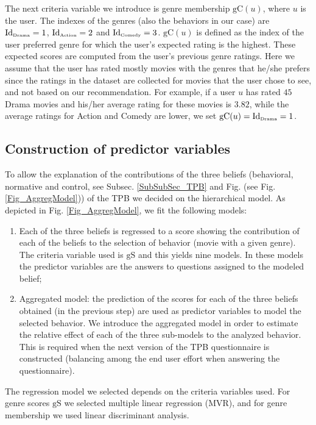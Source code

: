 \documentclass{llncs}
\def\gS{{\mbox{gS}}}
\def\gC{{\mbox{gC}}}
\def\Id{{\mbox{Id}}}
\begin{document}
The next criteria variable we introduce is genre membership $\gC(u)$, where $u$ is the user. The indexes of the genres (also the behaviors in our case) are $\Id_{\mbox{\tiny Drama}}=1$, $\Id_{\mbox{\tiny Action}}=2$ and $\Id_{\mbox{\tiny Comedy}}=3$. $\gC(u)$ is defined as the index of the user preferred genre for which the user's expected rating is the highest. These expected scores are computed from the user's previous genre ratings. Here we assume that the user has rated mostly movies with the genres that he/she prefers since the ratings in the dataset are collected for movies that the user chose to see, and not based on our recommendation.  For example, if a user $u$ has rated $45$ Drama movies and his/her average rating for these movies is $3.82$, while the average ratings for Action and Comedy are lower, we set $\gC(u)=\Id_{\mbox{\tiny Drama}}=1$.
 
\subsection{Construction of predictor variables}\label{SubSec_PredVarConstr} 

To allow the explanation of the contributions of the three beliefs (behavioral, normative and control, see Subsec.  \ref{SubSubSec_TPB} and Fig. (see Fig. \ref{Fig_AggregModel})) of the TPB we decided on the hierarchical model. As depicted in Fig. \ref{Fig_AggregModel}, we fit the following models:  
\begin{enumerate}
 \item Each of the three beliefs is regressed to a score showing the contribution of each of the beliefs to the selection of behavior (movie with a given genre). The criteria variable used is $\gS$ and this yields nine models. In these models the predictor variables are the answers to questions assigned to the modeled belief; 
 \item Aggregated model: the prediction of the scores for each of the three beliefs obtained (in the previous step) are used as predictor variables to model the selected behavior. We introduce the aggregated model in order to estimate the relative effect of each of the three sub-models to the analyzed behavior. This is required when the next version of the TPB questionnaire is constructed (balancing among the end user effort when answering the questionnaire).
\end{enumerate}
The regression model we selected depends on the criteria variables used. For genre scores $\gS$ we selected multiple linear regression (MVR), and for genre membership we used linear discriminant analysis.
 
\end{document}
